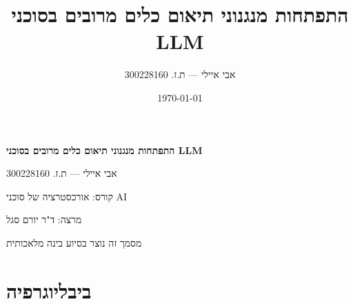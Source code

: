 \documentclass[12pt,a4paper]{report}
\title{התפתחות מנגנוני תיאום כלים מרובים בסוכני \textenglish{LLM}}
\author{אבי איילי --- ת.ז. \textenglish{300228160}}
\date{\today}
\begin{document}
\begin{titlepage}
\thispagestyle{empty}
\begin{hebrew}
\begin{center}
\vspace*{3cm}
{\bfseries\LARGE התפתחות מנגנוני תיאום כלים מרובים בסוכני \textenglish{LLM}\par}
\vspace{1.5cm}
{\large אבי איילי --- ת.ז. \textenglish{300228160}\par}
{\large קורס: אורכסטרציה של סוכני \textenglish{AI}\par}
{\large מרצה: ד"ר יורם סגל\par}
{\large \textenglish{\the\year}\par}
\vspace{1.5cm}
{\small מסמך זה נוצר בסיוע בינה מלאכותית\par}
\end{center}
\end{hebrew}
\end{titlepage}
\tableofcontents
\newpage






\newpage

\newpage
\chapter*{ביבליוגרפיה}
\begin{english}
\sloppy
\printbibliography[heading=none]
\end{english}
\end{document}
